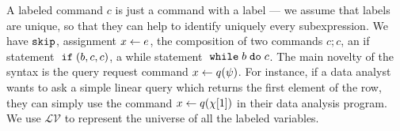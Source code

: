  A labeled command $c$ is just a command with a label --- we assume that labels are unique, so that they can help to identify uniquely every subexpression. We have $\mathtt{skip}$, assignment $\mathrel{ x \leftarrow e }$, the composition of two commands $c;c$, an if statement $\;\mathtt{if}\;(b, c, c)$, a while statement  $\;\mathtt{while}\; b \;\mathtt{do}\; {c} $.
 The main novelty of the syntax is the query request command $\mathrel{ x \leftarrow q(\psi) }$. For instance, if a data analyst wants to ask a simple linear query which returns the first element of the row, they can simply use the command $ \mathrel{ x \leftarrow q(\chi[1]) }$ in their data analysis program.
%
We use  
$\mathcal{LV}$ to represent the universe of all the labeled variables.
 